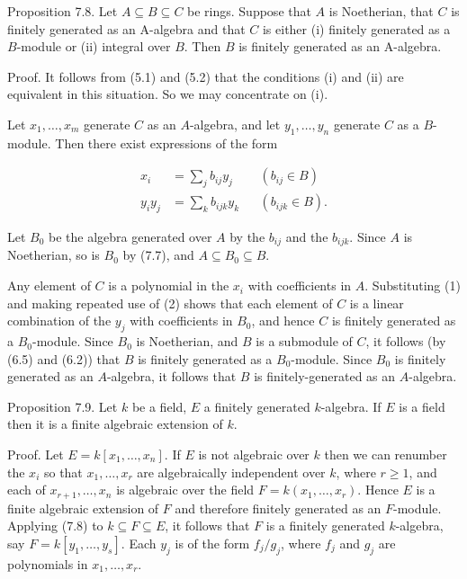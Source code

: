 \documentclass{standalone}
\theoremstyle{definition}
\theoremstyle{remark}
\begin{document}
Proposition 7.8. Let $A \subseteq B \subseteq C$ be rings. Suppose that $A$ is Noetherian, that $C$ is finitely generated as an A-algebra and that $C$ is either (i) finitely generated as a $B$-module or (ii) integral over $B$. Then $B$ is finitely generated as an A-algebra.

Proof. It follows from (5.1) and (5.2) that the conditions (i) and (ii) are equivalent in this situation. So we may concentrate on (i).

Let $x_{1}, \ldots, x_{m}$ generate $C$ as an $A$-algebra, and let $y_{1}, \ldots, y_{n}$ generate $C$ as a $B$-module. Then there exist expressions of the form

\[
\begin{aligned}
x_{i} & =\sum_{j} b_{i j} y_{j} & & \left(b_{i j} \in B\right) \\
y_{i} y_{j} & =\sum_{k} b_{i j k} y_{k} & & \left(b_{i j k} \in B\right) .
\end{aligned}
\]

Let $B_{0}$ be the algebra generated over $A$ by the $b_{i j}$ and the $b_{i j k}$. Since $A$ is Noetherian, so is $B_{0}$ by (7.7), and $A \subseteq B_{0} \subseteq B$.

Any element of $C$ is a polynomial in the $x_{i}$ with coefficients in $A$. Substituting (1) and making repeated use of (2) shows that each element of $C$ is a linear combination of the $y_{j}$ with coefficients in $B_{0}$, and hence $C$ is finitely generated as a $B_{0}$-module. Since $B_{0}$ is Noetherian, and $B$ is a submodule of $C$, it follows (by (6.5) and (6.2)) that $B$ is finitely generated as a $B_{0}$-module. Since $B_{0}$ is finitely generated as an $A$-algebra, it follows that $B$ is finitely-generated as an $A$-algebra.

Proposition 7.9. Let $k$ be a field, $E$ a finitely generated $k$-algebra. If $E$ is a field then it is a finite algebraic extension of $k$.

Proof. Let $E=k\left[x_{1}, \ldots, x_{n}\right]$. If $E$ is not algebraic over $k$ then we can renumber the $x_{i}$ so that $x_{1}, \ldots, x_{r}$ are algebraically independent over $k$, where $r \geqslant 1$, and each of $x_{r+1}, \ldots, x_{n}$ is algebraic over the field $F=k\left(x_{1}, \ldots, x_{r}\right)$. Hence $E$ is a finite algebraic extension of $F$ and therefore finitely generated as an $F$-module. Applying (7.8) to $k \subseteq F \subseteq E$, it follows that $F$ is a finitely generated $k$-algebra, say $F=k\left[y_{1}, \ldots, y_{s}\right]$. Each $y_{j}$ is of the form $f_{j} / g_{j}$, where $f_{j}$ and $g_{j}$ are polynomials in $x_{1}, \ldots, x_{r}$.
\end{document}
